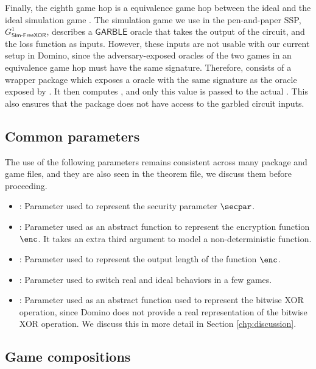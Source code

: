 Finally, the eighth game hop is a equivalence game hop between the ideal   and the ideal simulation game . The simulation game we use in the pen-and-paper SSP, $G^1_{\mathsf{Sim\text{-}FreeXOR}}$, describes a $\mathsf{GARBLE}$ oracle that takes the output of the circuit, and the loss function as inputs. However, these inputs are not usable with our current setup in Domino, since the adversary-exposed oracles of the two games in an equivalence game hop must have the same signature. Therefore,  consists of a wrapper package  which exposes a  oracle with the same signature as the oracle exposed by . It then computes , and only this value is passed to the actual . This also ensures that the  package does not have access to the garbled circuit inputs. 

\subsection{Common parameters}
\label{subsec:commonparams}
The use of the following parameters remains consistent across many package and game files, and they are also seen in the theorem file, we discuss them before proceeding.
\begin{itemize}
    \item {}: Parameter used to represent the security parameter $\secpar$.
    \item {}: Parameter used as an abstract function to represent the encryption function $\enc$. It takes an extra third argument to model a non-deterministic function.
    \item {}: Parameter used to represent the output length of the function $\enc$. 
    \item {}: Parameter used to switch real and ideal behaviors in a few games. 
    \item {}: Parameter used as an abstract function used to represent the bitwise XOR operation, since Domino does not provide a real representation of the bitwise XOR operation. We discuss this in more detail in Section \ref{chp:discussion}.
\end{itemize}

\subsection{Game compositions}
\label{subsec:encodegames}

